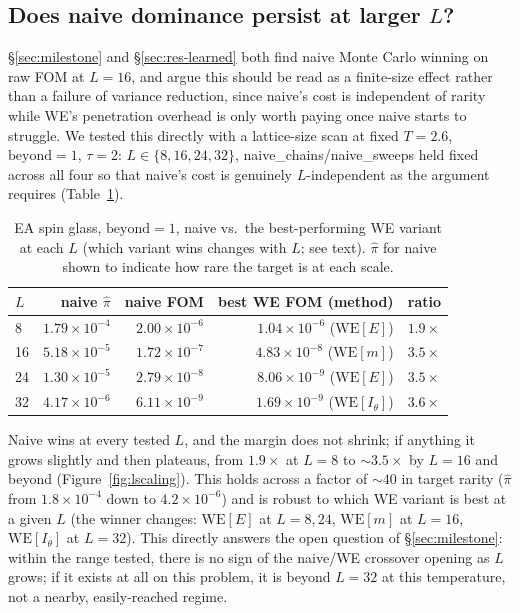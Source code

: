 \documentclass[a4paper,fleqn]{cas-sc}
\let\Oldsubsection\subsection
\renewcommand{\subsection}{\FloatBarrier\Oldsubsection}
\begin{document}
	\subsection{Does naive dominance persist at larger $L$?}\label{sec:lscaling}
	\S\ref{sec:milestone} and \S\ref{sec:res-learned} both find naive Monte Carlo winning on
	raw FOM at $L=16$, and argue this should be read as a finite-size effect rather than a
	failure of variance reduction, since naive's cost is independent of rarity while WE's
	penetration overhead is only worth paying once naive starts to struggle. We tested this
	directly with a lattice-size scan at fixed $T=2.6$, $\mathrm{beyond}=1$, $\tau=2$: $L\in
	\{8,16,24,32\}$, naive\_chains/naive\_sweeps held fixed across all four so that naive's
	cost is genuinely $L$-independent as the argument requires (Table~\ref{tab:lscaling}).
	
	\begin{table}[H]
		\centering\small
		\caption{EA spin glass, $\mathrm{beyond}=1$, naive vs.\ the best-performing WE variant at
			each $L$ (which variant wins changes with $L$; see text). $\hat\pi$ for naive shown to
			indicate how rare the target is at each scale.}
		\label{tab:lscaling}
		\begin{tabular}{lrrrr}
			\toprule
			$L$ & naive $\hat\pi$ & naive FOM & best WE FOM (method) & ratio \\
			\midrule
			8 & $1.79\times10^{-4}$ & $2.00\times10^{-6}$ & $1.04\times10^{-6}$ ($\mathrm{WE}[E]$) & $1.9\times$ \\
			16 & $5.18\times10^{-5}$ & $1.72\times10^{-7}$ & $4.83\times10^{-8}$ ($\mathrm{WE}[m]$) & $3.5\times$ \\
			24 & $1.30\times10^{-5}$ & $2.79\times10^{-8}$ & $8.06\times10^{-9}$ ($\mathrm{WE}[E]$) & $3.5\times$ \\
			32 & $4.17\times10^{-6}$ & $6.11\times10^{-9}$ & $1.69\times10^{-9}$ ($\mathrm{WE}[I_\theta]$) & $3.6\times$ \\
			\bottomrule
		\end{tabular}
	\end{table}
	
	Naive wins at every tested $L$, and the margin does not shrink; if anything it
	grows slightly and then plateaus, from $1.9\times$ at $L=8$ to $\sim\!3.5\times$ by
	$L=16$ and beyond (Figure~\ref{fig:lscaling}). This holds across a factor of ${\sim}40$ in target rarity
	($\hat\pi$ from $1.8\times10^{-4}$ down to $4.2\times10^{-6}$) and is robust to which WE
	variant is best at a given $L$ (the winner changes: $\mathrm{WE}[E]$ at $L=8,24$,
	$\mathrm{WE}[m]$ at $L=16$, $\mathrm{WE}[I_\theta]$ at $L=32$). This directly answers the
	open question of \S\ref{sec:milestone}: within the range tested, there is no sign
	of the naive/WE crossover opening as $L$ grows; if it exists at all on this problem, it is
	beyond $L=32$ at this temperature, not a nearby, easily-reached regime.
	
\end{document}
